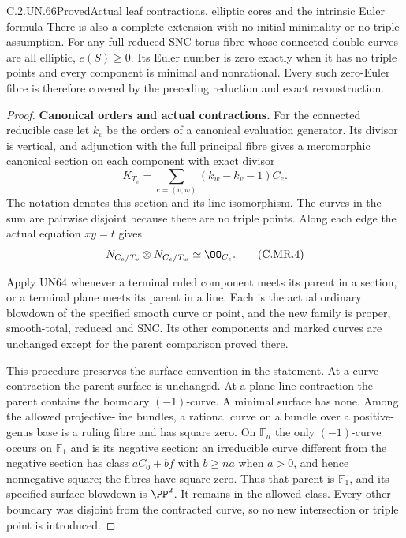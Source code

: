 \begin{statement}{C.2.UN.66}{Proved}{Actual leaf contractions, elliptic cores and the intrinsic Euler formula}
There is also a complete extension with no initial minimality
or no-triple assumption. For any full reduced SNC torus fibre
whose connected double curves are all elliptic, $e(S)\ge0$.
Its Euler number is zero exactly when it has no triple
points and every component is minimal and nonrational.
Every such zero-Euler fibre is therefore covered by the
preceding reduction and exact reconstruction.
\end{statement}

\begin{proof}
\par\medskip\noindent\textbf{Canonical orders and actual contractions.}
For the connected reducible case let $k_v$ be the orders of
a canonical evaluation generator. Its divisor is vertical,
and adjunction with the full principal fibre gives a
meromorphic canonical section on each component with exact
divisor
\[
 K_{T_v}=
       \sum_{e=(v,w)}(k_w-k_v-1)C_e.
\tag{C.MR.3}
\]
The notation denotes this section and its line isomorphism.
The curves in the sum are pairwise disjoint because there
are no triple points. Along each edge the actual equation
$xy=t$ gives
\[
                 N_{C_e/T_v}\otimes N_{C_e/T_w}
                                        \simeq\OO_{C_e}.
\tag{C.MR.4}
\]

Apply UN64 whenever a terminal ruled component meets its
parent in a section, or a terminal plane meets its parent
in a line. Each is the actual ordinary blowdown of the
specified smooth curve or point, and the new family is
proper, smooth-total, reduced and SNC. Its other components
and marked curves are unchanged except for the parent
comparison proved there.

This procedure preserves the surface convention in the
statement. At a curve contraction the parent surface is
unchanged. At a plane-line contraction the parent contains
the boundary $(-1)$-curve. A minimal surface has none.
Among the allowed projective-line bundles, a rational
curve on a bundle over a positive-genus base is a ruling
fibre and has square zero. On $\mathbb F_n$ the only
$(-1)$-curve occurs on $\mathbb F_1$ and is its negative
section: an irreducible curve different from the negative
section has class $aC_0+bf$ with $b\ge na$ when $a>0$,
and hence nonnegative square; the fibres have square zero.
Thus that parent is $\mathbb F_1$, and its specified
surface blowdown is $\PP^2$. It remains in the allowed
class. Every other boundary was disjoint from the
contracted curve, so no new intersection or triple point
is introduced.


\end{proof}
